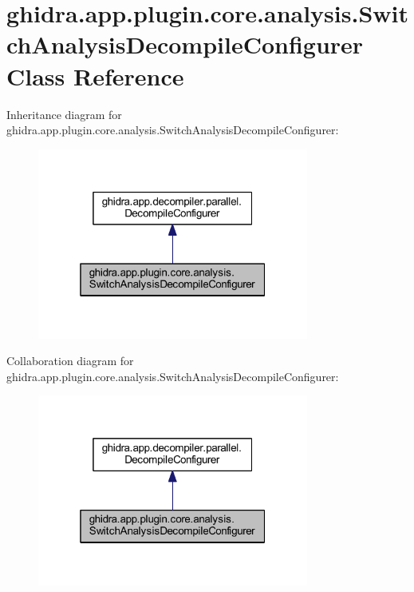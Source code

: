 \hypertarget{classghidra_1_1app_1_1plugin_1_1core_1_1analysis_1_1_switch_analysis_decompile_configurer}{}\section{ghidra.\+app.\+plugin.\+core.\+analysis.\+Switch\+Analysis\+Decompile\+Configurer Class Reference}
\label{classghidra_1_1app_1_1plugin_1_1core_1_1analysis_1_1_switch_analysis_decompile_configurer}


Inheritance diagram for ghidra.\+app.\+plugin.\+core.\+analysis.\+Switch\+Analysis\+Decompile\+Configurer\+:
\nopagebreak
\begin{figure}[H]
\begin{center}
\leavevmode
\includegraphics[width=253pt]{classghidra_1_1app_1_1plugin_1_1core_1_1analysis_1_1_switch_analysis_decompile_configurer__inherit__graph}
\end{center}
\end{figure}


Collaboration diagram for ghidra.\+app.\+plugin.\+core.\+analysis.\+Switch\+Analysis\+Decompile\+Configurer\+:
\nopagebreak
\begin{figure}[H]
\begin{center}
\leavevmode
\includegraphics[width=253pt]{classghidra_1_1app_1_1plugin_1_1core_1_1analysis_1_1_switch_analysis_decompile_configurer__coll__graph}
\end{center}
\end{figure}

